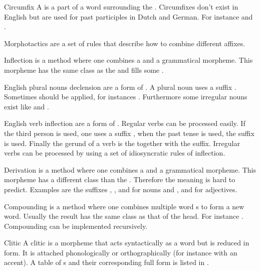 \begin{df}{Circumfix}
A \sb{} is a part of a word surrounding the . Circumfixes don't exist in English but are used for past participles in Dutch and German. For instance  and .
\end{df}
\begin{df}{Morphotactics}
\sb{} are a set of rules that describe how to combine different affixes.
\end{df}
\begin{df}{Inflection}
\sb{} is a method where one combines a  and a grammatical morpheme. This morpheme has the same \pos{} class as the  and fills some .
\end{df}
\begin{df}{English plural nouns declension}
\sb{} are a form of . A plural noun uses a suffix . Sometimes  should be applied, for instances . Furthermore some irregular nouns exist like  and .
\end{df}
\begin{df}{English verb inflection}
\sb{} are a form of . Regular verbs can be processed easily. If the third person is used, one uses a suffix , when the past tense is used, the suffix  is used. Finally the gerund of a verb is the  together with the  suffix. Irregular verbs can be processed by using a set of idiosyncratic rules of inflection.
\end{df}
\begin{df}{Derivation}
\sb{} is a method where one combines a  and a grammatical morpheme. This morpheme has a different \pos{} class than the . Therefore the meaning is hard to predict. Examples are the suffixes , ,  and  for nouns and ,  and  for adjectives.
\end{df}
\begin{df}{Compounding}
\sb{} is a method where one combines multiple word s to form a new word. Usually the result has the same class as that of the head. For instance . Compounding can be implemented recursively.
\end{df}
\begin{df}{Clitic}
A clitic is a morpheme that acts syntactically as a word but is reduced in form. It is attached phonologically or orthographically (for instance with an accent). A table of \sb{}s and their corresponding full form is listed in .
\end{df}
